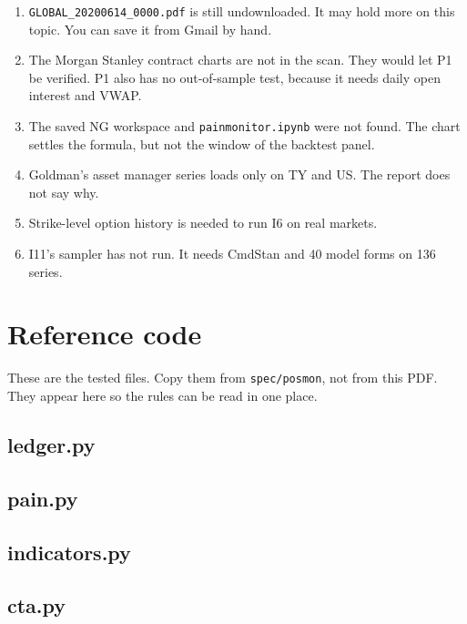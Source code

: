 \documentclass[11pt,a4paper]{article}
\newcommand{\code}[1]{\nolinkurl{#1}}
\newcommand{\sublabel}[1]{\par\vspace{3pt}\needspace{3\baselineskip}{\sffamily\small\bfseries #1}\par\nopagebreak[4]\vspace{1pt}}
\begin{document}
\sublabel{Still open}
\begin{enumerate}
\item \code{GLOBAL_20200614_0000.pdf} is still undownloaded. It may hold more on this topic. You can save it from Gmail by hand.
\item The Morgan Stanley contract charts are not in the scan. They would let P1 be verified. P1 also has no out-of-sample test, because it needs daily open interest and VWAP.
\item The saved NG workspace and \code{painmonitor.ipynb} were not found. The chart settles the formula, but not the window of the backtest panel.
\item Goldman's asset manager series loads only on TY and US. The report does not say why.
\item Strike-level option history is needed to run I6 on real markets.
\item I11's sampler has not run. It needs CmdStan and 40 model forms on 136 series.
\end{enumerate}

\appendix
{}
\section{Reference code}\label{sec:code}

These are the tested files. Copy them from \code{spec/posmon}, not from this PDF. They appear here so the rules can be read in one place.

\subsection{ledger.py}

\subsection{pain.py}

\subsection{indicators.py}

\subsection{cta.py}

\end{document}
